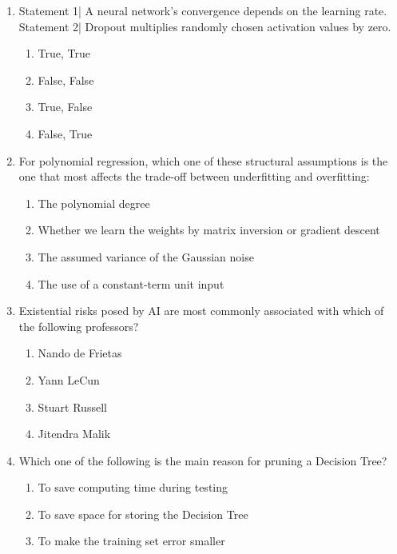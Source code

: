 \documentclass[{\csname fa0013Font0\endcsname\char"0033}{\csname fa0014Font0\endcsname\char"0034}pt]{article}
\begin{document}
\begin{enumerate}[label=\arabic*.]
\begin{enumerate}[label=(\alph*)]
    \item O(1)
    \item O( N )
    \item O(log N )
    \item O( N\^{}2 )
\end{enumerate}
\item Statement 1| A neural network's convergence depends on the learning rate. Statement 2| Dropout multiplies randomly chosen activation values by zero.
\begin{enumerate}[label=(\alph*)]
    \item True, True
    \item False, False
    \item True, False
    \item False, True
\end{enumerate}
\item For polynomial regression, which one of these structural assumptions is the one that most affects the trade-off between underfitting and overfitting:
\begin{enumerate}[label=(\alph*)]
    \item The polynomial degree
    \item Whether we learn the weights by matrix inversion or gradient descent
    \item The assumed variance of the Gaussian noise
    \item The use of a constant-term unit input
\end{enumerate}
\item Existential risks posed by AI are most commonly associated with which of the following professors?
\begin{enumerate}[label=(\alph*)]
    \item Nando de Frietas
    \item Yann LeCun
    \item Stuart Russell
    \item Jitendra Malik
\end{enumerate}
\item Which one of the following is the main reason for pruning a Decision Tree?
\begin{enumerate}[label=(\alph*)]
    \item To save computing time during testing
    \item To save space for storing the Decision Tree
    \item To make the training set error smaller

\end{enumerate}
\end{enumerate}
\end{document}
